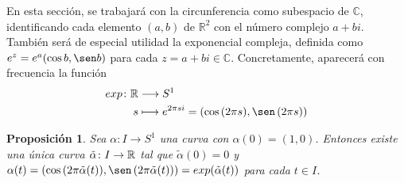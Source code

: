 \documentclass[11pt]{report}
\newtheorem{proposition}{Proposición}[chapter]
\theoremstyle{definition}
\theoremstyle{definition}
\theoremstyle{remark}
\newcommand{\R}{\mathbb R}
\newcommand{\C}{\mathbb C}
\begin{document}
En esta sección, se trabajará con la circunferencia como subespacio de $\C$, identificando cada elemento $(a,b)$ de $\R^2$ con el número complejo $a+bi$. También será de especial utilidad la exponencial compleja, definida como $e^z = e^a(\cos b, \sen b)$ para cada $z = a+bi \in \C$. Concretamente, aparecerá con frecuencia la función
\[\begin{aligned}[t]
    exp \colon \R &\longrightarrow S^1 \\
    s &\longmapsto e^{2\pi si} = (\cos \, (2\pi s), \sen \, (2\pi s))
\end{aligned}\]

\begin{proposition}
Sea $\alpha \colon I \to S^1$ una curva con $\alpha(0) = (1,0)$. Entonces existe una única curva $\Tilde{\alpha} \colon I \to \R$ tal que $\tilde{\alpha}(0) = 0$ y $\alpha(t) = (\cos \, (2\pi \Tilde{\alpha}(t)),\sen \,(2\pi\Tilde{\alpha}(t))) = exp(\tilde{\alpha}(t))$ para cada $t \in I$.
\end{proposition}
\end{document}
